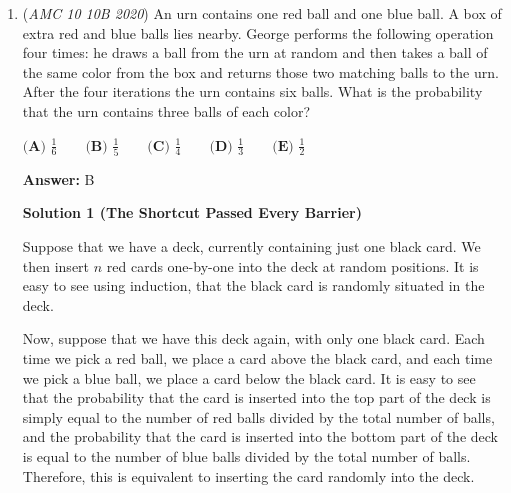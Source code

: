 \begin{enumerate}
 There are $5$ possible sets of $3$ diameters to draw.Notice we are technically choosing the number of ways to choose a pair of two diameters that are neighbors to each other. This means we can choose the first diameter in the pair, and have only two diameters to choose from for the second in the pair. This means we have $5 \cdot 2=10$ possibilities for choosing 5 neighboring diameters. However, notice that there are duplicates, so we divide the $10$ possibilities by $2$ to get $\boxed{\textbf{5}}$.

 Note that there cannot be a case with $4$ diameters because then there would have to be $5$ diameters for the two remaining people as they have to be connected with a diameter. A contradiction arises.

 Case 4: $5$ diameters

 There is only $\boxed{\textbf{1}}$ way to do this.

 Thus, in total there are $2+5+5+1=\boxed{\textbf{(C) }13}$ possible ways.

 Definetly go check it out!

 


	\item (\textit{AMC 10 10B 2020}) An urn contains one red ball and one blue ball. A box of extra red and blue balls lies nearby. George performs the following operation four times: he draws a ball from the urn at random and then takes a ball of the same color from the box and returns those two matching balls to the urn. After the four iterations the urn contains six balls. What is the probability that the urn contains three balls of each color?


 $\textbf{(A) } \frac16 \qquad \textbf{(B) }\frac15 \qquad \textbf{(C) } \frac14 \qquad \textbf{(D) } \frac13 \qquad \textbf{(E) } \frac12$

 \textbf{Answer: }B



\textbf{Solution 1 (The Shortcut Passed Every Barrier)}

Suppose that we have a deck, currently containing just one black card. We then insert $n$ red cards one-by-one into the deck at random positions. It is easy to see using induction, that the black card is randomly situated in the deck. 

 Now, suppose that we have this deck again, with only one black card. Each time we pick a red ball, we place a card above the black card, and each time we pick a blue ball, we place a card below the black card. It is easy to see that the probability that the card is inserted into the top part of the deck is simply equal to the number of red balls divided by the total number of balls, and the probability that the card is inserted into the bottom part of the deck is equal to the number of blue balls divided by the total number of balls. Therefore, this is equivalent to inserting the card randomly into the deck.


\end{enumerate}
